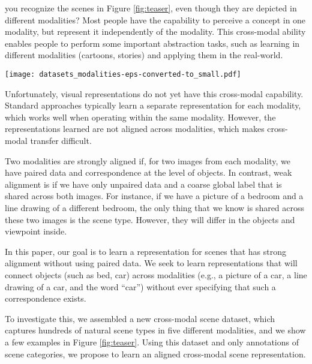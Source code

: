 \documentclass[10pt,journal,compsoc]{IEEEtran}
\begin{document}
     you recognize the scenes in Figure \ref{fig:teaser}, even though they are depicted in different modalities? Most people have the capability to perceive a concept in one modality, but represent it independently of the modality. This cross-modal ability enables people to perform some important abstraction tasks, such as learning in different modalities (cartoons, stories) and applying them in the real-world.
    
    \begin{figure*}
\centering
\texttt{[image: datasets\_modalities-eps-converted-to\_small.pdf]}
\vspace{2em}
\label{fig:teaser}
    \end{figure*}
    
    Unfortunately, visual representations do not yet have this cross-modal capability. Standard approaches typically learn a separate representation for each modality,  which works well when operating within the same modality. However, the representations learned are not aligned across modalities, which makes cross-modal transfer difficult. 
    
    Two modalities are strongly aligned if, for two images from each modality, we have paired data and correspondence at the level of objects. In contrast, weak alignment is if we have only unpaired data and a coarse global label that is shared across both images. For instance, if we have a picture of a bedroom and a line drawing of a different bedroom, the only thing that we know is shared across these two images is the scene type. However, they will differ in the objects and viewpoint inside.
    
    In this paper, our goal is to learn a representation for scenes that has strong alignment without using paired data. We seek to learn representations that will connect objects (such as bed, car) across modalities (e.g., a picture of a car, a line drawing of a car, and the word ``car'') without ever specifying that such a correspondence exists.
    
    To investigate this, we assembled a new cross-modal scene dataset, which captures hundreds of natural scene types in five different modalities, and we show a few examples in Figure \ref{fig:teaser}. Using this dataset and only annotations of scene categories, we propose to learn an aligned cross-modal scene representation. 
    
\end{document}
